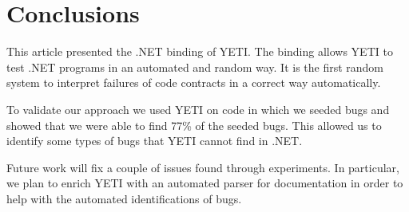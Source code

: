 \section{Conclusions}\label{sec:conc}
This article presented the .NET binding of YETI. The binding allows YETI to 
test .NET programs in an automated and random way. It is the first random system 
to interpret failures of code contracts in a correct way automatically.

To validate our approach we used YETI on code in which we seeded bugs and showed that
we were able to find 77\% of the seeded bugs. This allowed us to identify some types of bugs 
that YETI cannot find in .NET. 

Future work will fix a couple of issues found through experiments. In particular, 
we plan to enrich YETI with an automated parser for documentation in order to help 
with the automated identifications of bugs.